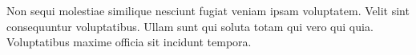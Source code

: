 

Non sequi molestiae similique nesciunt fugiat veniam ipsam voluptatem. Velit sint consequuntur voluptatibus. Ullam sunt qui soluta totam qui vero qui quia. Voluptatibus maxime officia sit incidunt tempora.

